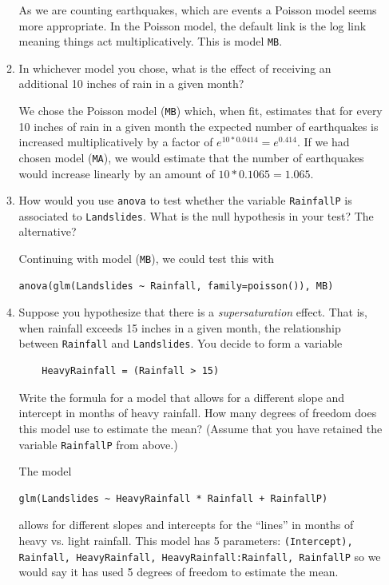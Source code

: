 \documentclass{article}
\begin{document}
\begin{enumerate}
\begin{enumerate}
{\color{red}
As we are counting earthquakes, which are events a Poisson model seems more appropriate.
In the Poisson model, the default link is the log link meaning things act multiplicatively.
This is model {\tt MB}.
}

\vspace{3in}

\item In whichever model you chose, what is the effect of receiving an additional 10 inches of rain in a given month?

{\color{red}
We chose the Poisson model ({\tt MB}) which, when fit, estimates that for every 10 inches of rain in a given
month the expected number of earthquakes is increased multiplicatively by a factor of
$e^{10*0.0414}=e^{0.414}$. 
If we had chosen model ({\tt MA}), we would estimate that the number of earthquakes would increase
linearly by an amount of $10*0.1065=1.065$.


}

\newpage 
\item How would you use {\tt anova} to test whether the variable {\tt RainfallP} is associated to {\tt Landslides}. 
What is the null hypothesis in your test? The alternative?

{\color{red}
Continuing with model  ({\tt MB}), we could test this with
\begin{verbatim}
anova(glm(Landslides ~ Rainfall, family=poisson()), MB)
\end{verbatim}
}

\item Suppose you hypothesize that there is a {\em supersaturation} effect.  That is, when rainfall exceeds 15 inches
in a given month, the relationship between {\tt Rainfall} and {\tt Landslides}. You decide to form a variable

\begin{verbatim}
    HeavyRainfall = (Rainfall > 15)
    \end{verbatim}
    
    Write the formula for a model that allows for a different slope and intercept in months of heavy rainfall. How many
    degrees of freedom does this model use to estimate the mean? ({\sc Assume that you have retained the variable {\tt RainfallP} from above.})
    
{\color{red}

The model
\begin{verbatim}
glm(Landslides ~ HeavyRainfall * Rainfall + RainfallP)
\end{verbatim}
allows for different slopes and intercepts for the ``lines'' in months of heavy vs. light rainfall.
This model has 5 parameters: {\tt (Intercept), Rainfall, HeavyRainfall, HeavyRainfall:Rainfall, RainfallP} so we would say it has used 5 degrees of freedom to estimate the mean.
}
\end{enumerate}


\end{enumerate}
\end{document}
